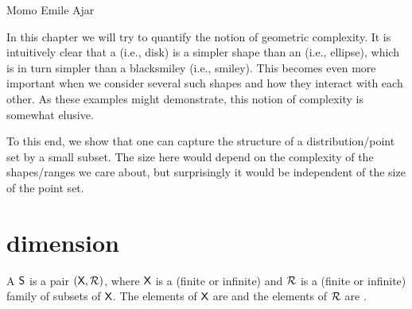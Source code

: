 % 

%


\ChapterPrefix{}
\ChapterGen{}


%
{Momo}%
{Emile Ajar}



\bigskip%
\noindent%
In this chapter we will try to quantify the notion of geometric
complexity. It is intuitively clear that a {\tiny \CircleSolid} (i.e.,
disk) is a simpler shape than an {\small \EllipseSolid} (i.e.,
ellipse), which is in turn simpler than a {blacksmiley} (i.e.,
smiley). This becomes even more important when we consider several
such shapes and how they interact with each other. As these examples
might demonstrate, this notion of complexity is somewhat elusive.

To this end, we show that one can capture the structure of a
distribution/point set by a small subset. The size here would depend
on the complexity of the shapes/ranges we care about, but surprisingly
it would be independent of the size of the point set.

\section{ dimension}

\begin{defn}
    A  $\mathsf{S}$ is a pair
    $(\textsf{X},{\mathcal{R}})$, where $\textsf{X}$ is a  (finite or infinite) and ${\mathcal{R}}$ is a (finite or
    infinite) family of subsets of $\textsf{X}$. The elements of
    $\textsf{X}$ are  and the elements of ${\mathcal{R}}$
    are .
\end{defn}

